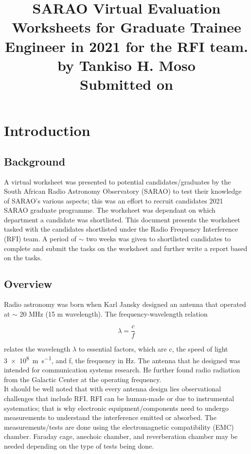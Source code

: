 \documentclass[12pt,a4paper]{report}
\begin{document}
	\title{SARAO Virtual Evaluation Worksheets for Graduate Trainee Engineer in 2021 for the RFI team.\\ [1cm]
		by Tankiso H. Moso\\[4cm]	
		Submitted on	
	}
	
	\maketitle

	
	\chapter{Introduction}
	\section{Background}
	A virtual worksheet was presented to potential candidates/graduates by the South African Radio Astronomy Observatory (SARAO) to test their knowledge of SARAO's various aspects; this was an effort to recruit candidates 2021 SARAO graduate programme. The worksheet was dependant on which department a candidate was shortlisted. This document presents the worksheet tasked with the candidates shortlisted under the Radio Frequency Interference (RFI) team. A period of $\sim$ two weeks was given to shortlisted candidates to complete and submit the tasks on the worksheet and further write a report based on the tasks.
	
	\section{Overview}
	
	Radio astronomy was born when Karl Jansky designed an antenna that operated at $\sim$ 20 MHz (15 m wavelength). The frequency-wavelength relation 
	
	\begin{equation}
	\lambda = \frac{c}{f}
	\end{equation}
	
	relates the wavelength $\lambda$ to essential factors, which are c, the speed of light \SI{3e8}{\metre\per\second}, and f, the frequency in Hz. The antenna that he designed was intended for communication systems research. He further found radio radiation from the Galactic Center at the operating frequency.\\
	
	It should be well noted that with every antenna design lies observational challenges that include RFI. RFI can be human-made or due to instrumental systematics; that is why electronic equipment/components need to undergo measurements to understand the interference emitted or absorbed. The measurements/tests are done using the electromagnetic compatibility (EMC) chamber. Faraday cage, anechoic chamber, and reverberation chamber may be needed depending on the type of tests being done.\\
	
\end{document}
